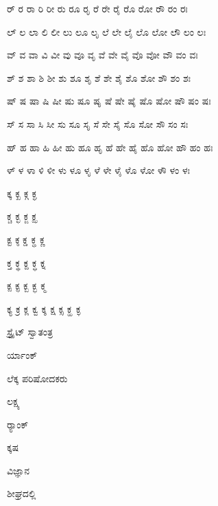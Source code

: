 \documentclass[10pt,oneside]{book}
\begin{document}
\begin{spacing}{1.6}
ರ್ ರ ರಾ ರಿ ರೀ ರು ರೂ ರೃ ರೆ ರೇ ರೈ ರೊ ರೋ ರೌ ರಂ ರಃ

ಲ್ ಲ ಲಾ ಲಿ ಲೀ ಲು ಲೂ ಲೃ ಲೆ ಲೇ ಲೈ ಲೊ ಲೋ ಲೌ ಲಂ ಲಃ

ವ್ ವ ವಾ ವಿ ವೀ ವು ವೂ ವೃ ವೆ ವೇ ವೈ ವೊ ವೋ ವೌ ವಂ ವಃ

ಶ್ ಶ ಶಾ ಶಿ ಶೀ ಶು ಶೂ ಶೃ ಶೆ ಶೇ ಶೈ ಶೊ ಶೋ ಶೌ ಶಂ ಶಃ

ಷ್ ಷ ಷಾ ಷಿ ಷೀ ಷು ಷೂ ಷೃ ಷೆ ಷೇ ಷೈ ಷೊ ಷೋ ಷೌ ಷಂ ಷಃ

ಸ್ ಸ ಸಾ ಸಿ ಸೀ ಸು ಸೂ ಸೃ ಸೆ ಸೇ ಸೈ ಸೊ ಸೋ ಸೌ ಸಂ ಸಃ

ಹ್ ಹ ಹಾ ಹಿ ಹೀ ಹು ಹೂ ಹೃ ಹೆ ಹೇ ಹೈ ಹೊ ಹೋ ಹೌ ಹಂ ಹಃ

ಳ್ ಳ ಳಾ ಳಿ ಳೀ ಳು ಳೂ ಳೃ ಳೆ ಳೇ ಳೈ ಳೊ ಳೋ ಳೌ ಳಂ ಳಃ

ಕ್ಕ ಕ್ಖ ಕ್ಗ ಕ್ಘ

ಕ್ಚ ಕ್ಛ ಕ್ಜ ಕ್ಝ

ಕ್ಟ ಕ್ಠ ಕ್ಡ ಕ್ಢ ಕ್ಣ

ಕ್ತ ಕ್ಥ ಕ್ದ ಕ್ಧ ಕ್ನ

ಕ್ಪ ಕ್ಫ ಕ್ಬ ಕ್ಭ ಕ್ಮ

ಕ್ಯ ಕ್ರ ಕ್ಲ ಕ್ವ ಕ್ಶ ಕ್ಷ ಕ್ಸ ಕ್ಹ ಕ್ಳ

ಸ್ಟ್ರೈಟ್ ಸ್ವಾತಂತ್ರ

ರ್ಯಾಂಕ್

ಲೆಕ್ಕ ಪರಿಷೋದಕರು

ಲಕ್ಷ್ಯ

ರ‍್ಯಾಂಕ್

ಕ್ಕಷ

ವಿಜ್ಞಾನ

ಶೀಘ್ರದಲ್ಲಿ 
\end{spacing}
\end{document}
